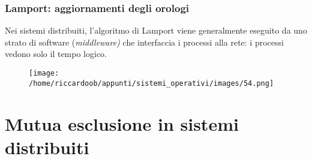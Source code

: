 \subsubsection{Lamport: aggiornamenti degli orologi}
Nei sistemi distribuiti, l'algoritmo di Lamport viene generalmente eseguito da uno strato di software (\textit{middleware)} che interfaccia i processi alla rete: i processi vedono solo il tempo logico.

\begin{figure}[H]
    \centering
    \texttt{[image: /home/riccardoob/appunti/sistemi\_operativi/images/54.png]}
\end{figure}

\section{Mutua esclusione in sistemi distribuiti}

























































